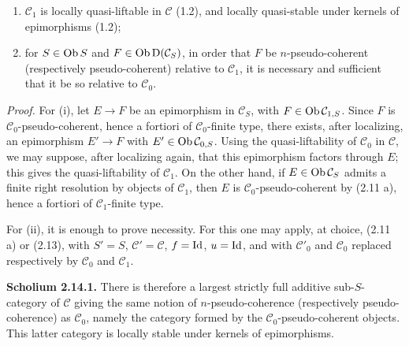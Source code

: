 \documentclass[11pt]{article}
\begin{document}
\begin{enumerate}[label=(\roman*)]
\item \(\mathcal C_1\) is locally quasi-liftable in \(\mathcal C\) (1.2), and locally quasi-stable under kernels of epimorphisms (1.2);
\item for \(S\in\operatorname{Ob} S\) and \(F\in\operatorname{Ob}\mathrm D(\mathcal C_S)\), in order that \(F\) be \(n\)-pseudo-coherent (respectively pseudo-coherent) relative to \(\mathcal C_1\), it is necessary and sufficient that it be so relative to \(\mathcal C_0\).
\end{enumerate}

\emph{Proof.} For (i), let \(E\to F\) be an epimorphism in \(\mathcal C_S\), with \(F\in\operatorname{Ob}\mathcal C_{1,S}\). Since \(F\) is \(\mathcal C_0\)-pseudo-coherent, hence a fortiori of \(\mathcal C_0\)-finite type, there exists, after localizing, an epimorphism \(E'\to F\) with \(E'\in\operatorname{Ob}\mathcal C_{0,S}\). Using the quasi-liftability of \(\mathcal C_0\) in \(\mathcal C\), we may suppose, after localizing again, that this epimorphism factors through \(E\); this gives the quasi-liftability of \(\mathcal C_1\). On the other hand, if \(E\in\operatorname{Ob}\mathcal C_S\) admits a finite right resolution by objects of \(\mathcal C_1\), then \(E\) is \(\mathcal C_0\)-pseudo-coherent by (2.11 a), hence a fortiori of \(\mathcal C_1\)-finite type.

For (ii), it is enough to prove necessity. For this one may apply, at choice, (2.11 a) or (2.13), with \(S'=S\), \(\mathcal C'=\mathcal C\), \(f=\operatorname{Id}\), \(u=\operatorname{Id}\), and with \(\mathcal C'_0\) and \(\mathcal C_0\) replaced respectively by \(\mathcal C_0\) and \(\mathcal C_1\).

\textbf{Scholium 2.14.1.} There is therefore a largest strictly full additive sub-\(S\)-category of \(\mathcal C\) giving the same notion of \(n\)-pseudo-coherence (respectively pseudo-coherence) as \(\mathcal C_0\), namely the category formed by the \(\mathcal C_0\)-pseudo-coherent objects. This latter category is locally stable under kernels of epimorphisms.
\end{document}
